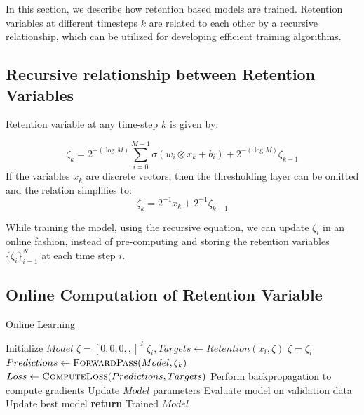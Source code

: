 In this section, we describe how retention based models are trained. Retention variables at different timesteps $k$ are related to each other by a recursive relationship, which can be utilized for developing efficient training algorithms. 

\subsection{Recursive relationship between Retention Variables}

Retention variable at any time-step $k$ is given by:

\begin{equation}
    \zeta_k = 2^{- (\log M)} \sum_{i=0}^{M-1} \sigma(w_i \otimes x_{k} + b_i)  + 2^{- (\log M)}\zeta_{k-1}
\end{equation}
If the variables $x_k$ are discrete vectors, then the thresholding layer can be omitted and the relation simplifies to:
\begin{equation}
    \zeta_k = 2^{- 1} x_k  + 2^{- 1}\zeta_{k-1}
\end{equation}

While training the model, using the recursive equation, we can update $\zeta_i$ in an online fashion, instead of pre-computing and storing the retention variables $\{\zeta_i\}_{i=1}^N$ at each time step $i$. 

\subsection{Online Computation of Retention Variable}

\begin{algorithm}
    \caption{Online Learning}
    \begin{algorithmic}[1]
        \State Initialize $Model$
            \State $\zeta = [0,0,0,,]^d$
                \State $\zeta_i, Targets \gets Retention(x_i,\zeta)$
                \State $\zeta = \zeta_i$
                \State $Predictions \gets \Call{ForwardPass}{Model, \zeta_k}$
                \State $Loss \gets \Call{ComputeLoss}{Predictions, Targets}$
                \State Perform backpropagation to compute gradients
                \State Update $Model$ parameters
            \EndFor
            \State Evaluate model on validation data
                \State Update best model
            \EndIf
        \EndFor
        \State \textbf{return} Trained $Model$
    \EndProcedure
    \end{algorithmic}
    \end{algorithm}
   
